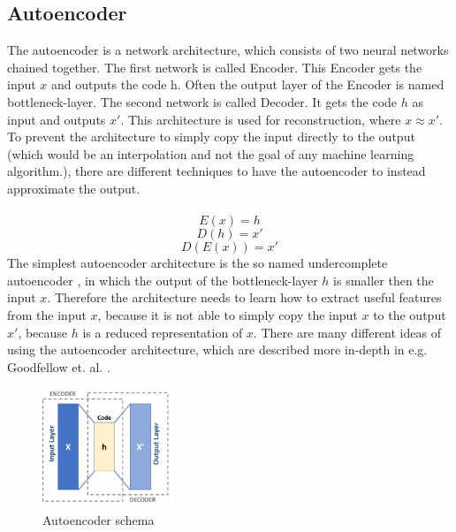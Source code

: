  \subsection{Autoencoder} \label{subsection::autoencoder}
  The autoencoder is a network architecture, which consists of two neural networks chained together. The first network is called Encoder. This Encoder gets the input $x$ and outputs
  the code h. Often the output layer of the Encoder is named bottleneck-layer. The second network is called Decoder. It gets the code $h$ as input
  and outputs $x \prime$. This architecture is used for reconstruction, where $x \approx x \prime$. To prevent the architecture to simply copy the input directly to the output (which would be an
  interpolation and not the goal of any machine learning algorithm.), there are different techniques to have the autoencoder to instead approximate the output.\\\\
  \begin{equation}
   E(x) = h
  \end{equation}
  \begin{equation}
   D(h) = x \prime
  \end{equation}
  \begin{equation}
   D(E(x)) = x \prime
  \end{equation}
  The simplest autoencoder architecture is the so named undercomplete autoencoder \cite{Goodfellow2016}, in which the output of the bottleneck-layer $h$ is smaller then the input $x$.
  Therefore the architecture needs to learn how to extract useful features from the input $x$, because it is not able to simply copy the input $x$ to the output $x \prime$, because $h$ is a reduced
  representation of $x$. There are many different ideas of using the autoencoder architecture, which are described more in-depth in e.g. Goodfellow et. al. \cite{Goodfellow2016}.
  \begin{figure}[H]
   \includegraphics[width=0.35\textwidth]{../Images/autoencoder_schema.png}
   \centering
   \caption{Autoencoder schema \cite{wiki2019}}
   \label{fig:lstm_architecture}
  \end{figure}

